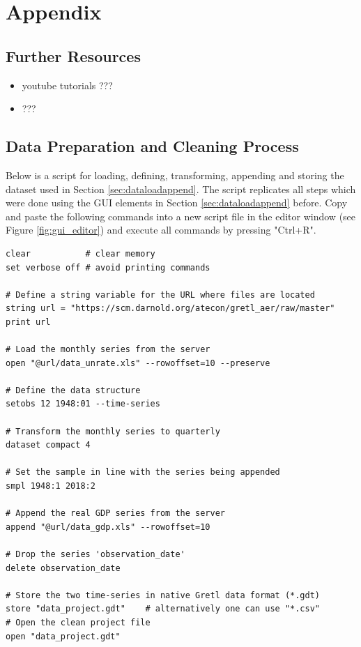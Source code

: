 \documentclass[11pt]{article}
\newcommand{\remph}[1]{{\color{myred}#1}}
\begin{document}


\newpage

\appendix
\setcounter{table}{0}
\renewcommand{\thetable}{A\arabic{table}}
\setcounter{figure}{0}
\renewcommand{\thefigure}{A\arabic{figure}}

\section{Appendix}

\subsection{Further Resources}
\remph{
\begin{itemize}
	\item youtube tutorials ???
	\item ???
\end{itemize}
}



\subsection{Data Preparation and Cleaning Process}
\label{sec:datapre}
Below is a script for loading, defining, transforming, appending and storing the dataset used in Section \ref{sec:dataloadappend}. The script replicates all steps which were done using the GUI elements in Section \ref{sec:dataloadappend} before. Copy and paste the following commands into a new script file in the editor window (see Figure \ref{fig:gui_editor}) and execute all commands by pressing "Ctrl+R".

\begin{Verbatim}[baselinestretch=0.75, frame=single, fontsize=\small]
clear			# clear memory
set verbose off	# avoid printing commands

# Define a string variable for the URL where files are located
string url = "https://scm.darnold.org/atecon/gretl_aer/raw/master"
print url

# Load the monthly series from the server
open "@url/data_unrate.xls" --rowoffset=10 --preserve

# Define the data structure
setobs 12 1948:01 --time-series

# Transform the monthly series to quarterly
dataset compact 4

# Set the sample in line with the series being appended
smpl 1948:1 2018:2

# Append the real GDP series from the server
append "@url/data_gdp.xls" --rowoffset=10

# Drop the series 'observation_date'
delete observation_date

# Store the two time-series in native Gretl data format (*.gdt)
store "data_project.gdt"	# alternatively one can use "*.csv"
# Open the clean project file
open "data_project.gdt"
\end{Verbatim}
\end{document}
